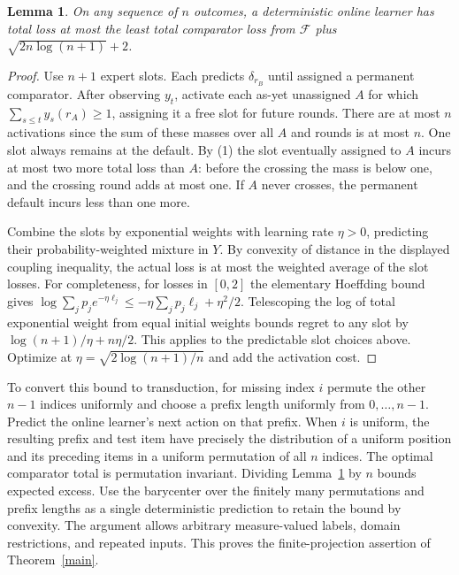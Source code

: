 \documentclass[11pt]{article}
\newtheorem{lemma}[theorem]{Lemma}
\begin{document}
\begin{lemma}\label{finite}
On any sequence of $n$ outcomes, a deterministic online learner has total loss at most the least total comparator loss from $\mathcal F$ plus $\sqrt{2n\log(n+1)}+2$.
\end{lemma}
\begin{proof}
Use $n+1$ expert slots. Each predicts $\delta_{r_B}$ until assigned a permanent comparator. After observing $y_t$, activate each as-yet unassigned $A$ for which $\sum_{s\le t} y_s(r_A)\ge1$, assigning it a free slot for future rounds. There are at most $n$ activations since the sum of these masses over all $A$ and rounds is at most $n$. One slot always remains at the default. By (1) the slot eventually assigned to $A$ incurs at most two more total loss than $A$: before the crossing the mass is below one, and the crossing round adds at most one. If $A$ never crosses, the permanent default incurs less than one more.

Combine the slots by exponential weights with learning rate $\eta>0$, predicting their probability-weighted mixture in $Y$. By convexity of distance in the displayed coupling inequality, the actual loss is at most the weighted average of the slot losses. For completeness, for losses in $[0,2]$ the elementary Hoeffding bound gives $\log\sum_j p_j e^{-\eta\ell_j}\le-\eta\sum_j p_j\ell_j+\eta^2/2$. Telescoping the log of total exponential weight from equal initial weights bounds regret to any slot by $\log(n+1)/\eta+n\eta/2$. This applies to the predictable slot choices above. Optimize at $\eta=\sqrt{2\log(n+1)/n}$ and add the activation cost.
\end{proof}

To convert this bound to transduction, for missing index $i$ permute the other $n-1$ indices uniformly and choose a prefix length uniformly from $0,\ldots,n-1$. Predict the online learner's next action on that prefix. When $i$ is uniform, the resulting prefix and test item have precisely the distribution of a uniform position and its preceding items in a uniform permutation of all $n$ indices. The optimal comparator total is permutation invariant. Dividing Lemma~\ref{finite} by $n$ bounds expected excess. Use the barycenter over the finitely many permutations and prefix lengths as a single deterministic prediction to retain the bound by convexity. The argument allows arbitrary measure-valued labels, domain restrictions, and repeated inputs. This proves the finite-projection assertion of Theorem~\ref{main}.
\end{document}
